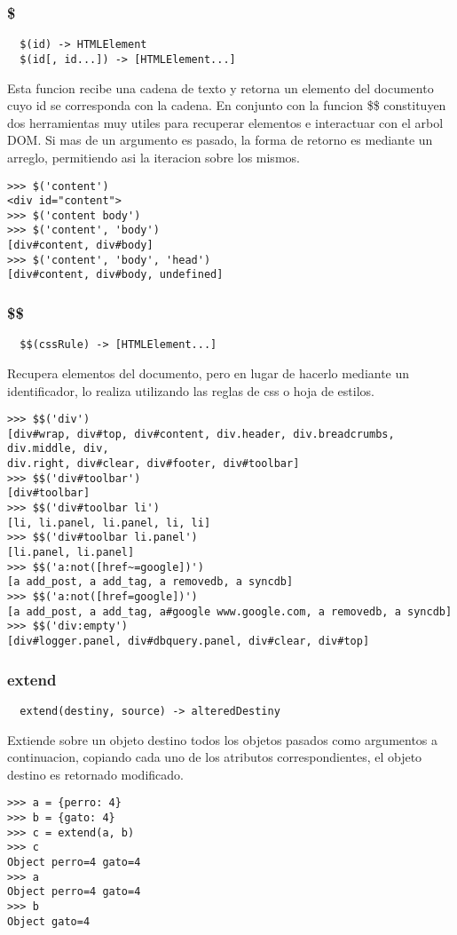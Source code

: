 \subsubsection*{\$}
\begin{verbatim}
  $(id) -> HTMLElement
  $(id[, id...]) -> [HTMLElement...]
\end{verbatim}
Esta funcion recibe una cadena de texto y retorna un elemento del documento cuyo
id se corresponda con la cadena. En conjunto con la funcion \$\$ constituyen dos
herramientas muy utiles para recuperar elementos e interactuar con el arbol DOM.
Si mas de un argumento es pasado, la forma de retorno es mediante un arreglo,
permitiendo asi la iteracion sobre los mismos.
\begin{lstlisting}[style=consola]
>>> $('content')
<div id="content">
>>> $('content body')
>>> $('content', 'body')
[div#content, div#body]
>>> $('content', 'body', 'head')
[div#content, div#body, undefined]
\end{lstlisting}

\subsubsection*{\$\$}
\begin{verbatim}
  $$(cssRule) -> [HTMLElement...]
\end{verbatim}
Recupera elementos del documento, pero en lugar de hacerlo mediante un
identificador, lo realiza utilizando las reglas de css o hoja de estilos.
\begin{lstlisting}[style=consola]
>>> $$('div')
[div#wrap, div#top, div#content, div.header, div.breadcrumbs, div.middle, div,
div.right, div#clear, div#footer, div#toolbar]
>>> $$('div#toolbar')
[div#toolbar]
>>> $$('div#toolbar li')
[li, li.panel, li.panel, li, li]
>>> $$('div#toolbar li.panel')
[li.panel, li.panel]
>>> $$('a:not([href~=google])')
[a add_post, a add_tag, a removedb, a syncdb]
>>> $$('a:not([href=google])')
[a add_post, a add_tag, a#google www.google.com, a removedb, a syncdb]
>>> $$('div:empty')
[div#logger.panel, div#dbquery.panel, div#clear, div#top]
\end{lstlisting}

\subsubsection*{extend}
\begin{verbatim}
  extend(destiny, source) -> alteredDestiny
\end{verbatim}
Extiende sobre un objeto destino todos los objetos pasados como argumentos a
continuacion, copiando cada uno de los atributos correspondientes, el objeto
destino es retornado modificado.
\begin{lstlisting}[style=consola]
>>> a = {perro: 4}
>>> b = {gato: 4}
>>> c = extend(a, b)
>>> c
Object perro=4 gato=4
>>> a
Object perro=4 gato=4
>>> b
Object gato=4
\end{lstlisting}

